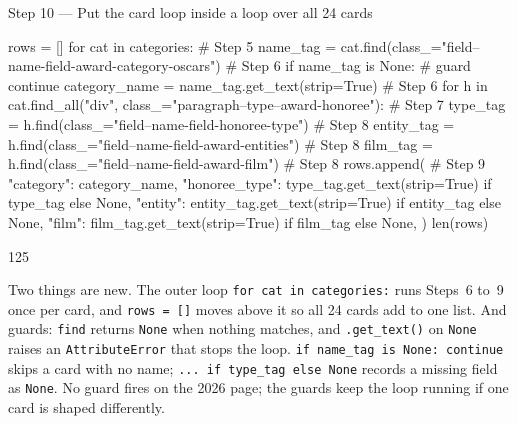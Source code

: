 \documentclass{handout}
\begin{document}
\begin{frame}{Step 10 --- Put the card loop inside a loop over all 24 cards}
\begin{code}
rows = []
for cat in categories:                                                      # Step 5
    name_tag = cat.find(class_="field--name-field-award-category-oscars")   # Step 6
    if name_tag is None:                                                    # guard
        continue
    category_name = name_tag.get_text(strip=True)                           # Step 6
    for h in cat.find_all("div", class_="paragraph--type--award-honoree"):  # Step 7
        type_tag = h.find(class_="field--name-field-honoree-type")          # Step 8
        entity_tag = h.find(class_="field--name-field-award-entities")      # Step 8
        film_tag = h.find(class_="field--name-field-award-film")            # Step 8
        rows.append({                                                       # Step 9
            "category": category_name,
            "honoree_type": type_tag.get_text(strip=True) if type_tag else None,
            "entity": entity_tag.get_text(strip=True) if entity_tag else None,
            "film": film_tag.get_text(strip=True) if film_tag else None,
        })
len(rows)
\end{code}
\begin{out}
125
\end{out}
Two things are new. The outer loop \texttt{for cat in categories:} runs
Steps~6 to~9 once per card, and \texttt{rows = []} moves above it so all
24 cards add to one list. And guards: \texttt{find} returns \texttt{None}
when nothing matches, and \texttt{.get\_text()} on \texttt{None} raises an
\texttt{AttributeError} that stops the loop. \texttt{if name\_tag is None:
continue} skips a card with no name; \texttt{... if type\_tag else None}
records a missing field as \texttt{None}. No guard fires on the 2026 page;
the guards keep the loop running if one card is shaped differently.
\end{frame}
\end{document}
